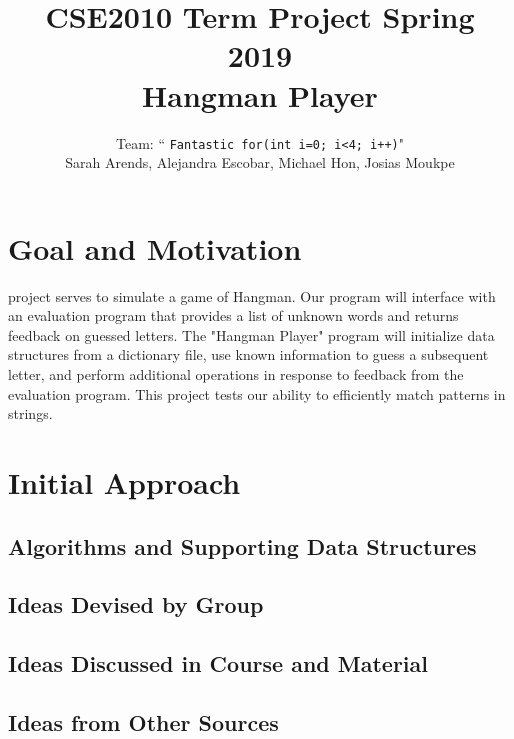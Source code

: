 \documentclass[journal, a4paper]{IEEEtran}
\begin{document}
	\title{CSE2010 Term Project Spring 2019 \\ Hangman Player}
	\author{Team: `` \texttt{Fantastic for(int i=0; i<4; i++)}" \\ Sarah Arends, Alejandra Escobar, Michael Hon, Josias Moukpe}
	\maketitle


\section{Goal and Motivation}
 project serves to simulate a game of Hangman. Our program will interface with an evaluation program that provides a list of unknown words and returns feedback on guessed letters. The "Hangman Player" program will initialize data structures from a dictionary file, use known information to guess a subsequent letter, and perform additional operations in response to feedback from the evaluation program. This project tests our ability to efficiently match patterns in strings.

\section{Initial Approach}

\subsection{Algorithms and Supporting Data Structures}

\subsection{Ideas Devised by Group}

\subsection{Ideas Discussed in Course and Material}

\subsection{Ideas from Other Sources}
\end{document}
